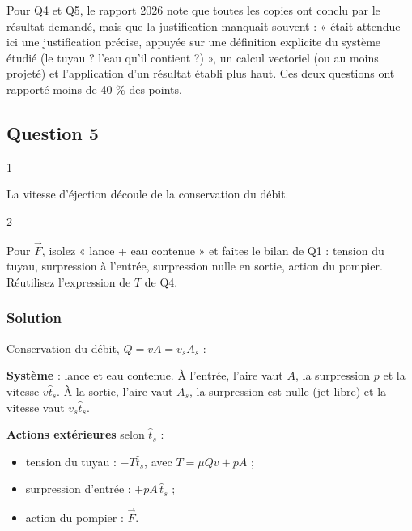 \documentclass[11pt,a4paper]{article}
\providecommand{\tightlist}{\setlength{\itemsep}{0pt}\setlength{\parskip}{0pt}}
\newcommand{\equationajustee}[1]{%
  \sbox{\boiteequation}{$\displaystyle #1$}%
  \ifdim\wd\boiteequation>\linewidth
    \[\resizebox{\linewidth}{!}{\usebox{\boiteequation}}\]%
  \else
    \[#1\]%
  \fi}
\begin{document}
\begin{jury}

Pour Q4 et Q5, le rapport 2026 note que toutes les copies ont conclu par le résultat demandé, mais que la justification manquait souvent : « était attendue ici une justification précise, appuyée sur une définition explicite du système étudié (le tuyau ? l'eau qu'il contient ?) », un calcul vectoriel (ou au moins projeté) et l'application d'un résultat établi plus haut. Ces deux questions ont rapporté moins de 40 \% des points.

\end{jury}

\hypertarget{question-5}{%
\subsection{Question 5}\label{question-5}}

\begin{indication}{1}

La vitesse d'éjection découle de la conservation du débit.

\end{indication}

\begin{indication}{2}

Pour \(\vec F\), isolez « lance + eau contenue » et faites le bilan de Q1 : tension du tuyau, surpression à l'entrée, surpression nulle en sortie, action du pompier. Réutilisez l'expression de \(T\) de Q4.

\end{indication}

\hypertarget{solution-4}{%
\subsubsection{Solution}\label{solution-4}}

Conservation du débit, \(Q=vA=v_sA_s\) :

\equationajustee{\boxed{v_s=\frac{A}{A_s}\,v}}

\textbf{Système} : lance et eau contenue. À l'entrée, l'aire vaut \(A\), la surpression \(p\) et la vitesse \(v\hat t_s\). À la sortie, l'aire vaut \(A_s\), la surpression est nulle (jet libre) et la vitesse vaut \(v_s\hat t_s\).

\textbf{Actions extérieures} selon \(\hat t_s\) :

\begin{itemize}
\tightlist
\item
  tension du tuyau : \(-T\hat t_s\), avec \(T=\mu Qv+pA\) ;
\item
  surpression d'entrée : \(+pA\,\hat t_s\) ;
\item
  action du pompier : \(\vec F\).
\end{itemize}
\end{document}
